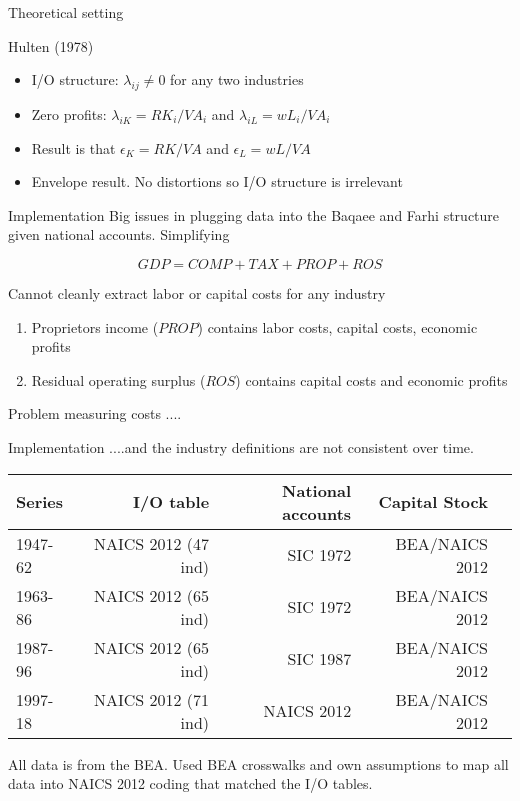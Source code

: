 \documentclass[10pt, xcolor=dvipsnames]{beamer}
\begin{document}
\begin{frame}{Theoretical setting}

Hulten (1978)
\begin{itemize}
  \item I/O structure: $\lambda_{ij} \neq 0$ for any two industries
  \item Zero profits: $\lambda_{iK} = RK_i/VA_i$ and $\lambda_{iL} = wL_i/VA_i$
  \item Result is that $\epsilon_K = RK/VA$ and $\epsilon_L = wL/VA$
  \item Envelope result. No distortions so I/O structure is irrelevant
\end{itemize}

\end{frame}

\begin{frame}{Implementation}
Big issues in plugging data into the Baqaee and Farhi structure given national accounts. Simplifying

\begin{equation}
  GDP = COMP + TAX + PROP + ROS
\end{equation}

Cannot cleanly extract labor or capital costs for any industry
\begin{enumerate}
  \item Proprietors income ($PROP$) contains labor costs, capital costs, economic profits
  \item Residual operating surplus ($ROS$) contains capital costs and economic profits
\end{enumerate}

Problem measuring costs ....

\end{frame}

\begin{frame}{Implementation}
....and the industry definitions are not consistent over time.

\vspace{.25in}

\begin{tabular}{lrrrr}
Series  & I/O table  & National accounts & Capital Stock \\ \hline
1947-62 & NAICS 2012 (47 ind) & SIC 1972 & BEA/NAICS 2012 \\
1963-86 & NAICS 2012 (65 ind) & SIC 1972 & BEA/NAICS 2012 \\
1987-96 & NAICS 2012 (65 ind) & SIC 1987 & BEA/NAICS 2012 \\
1997-18 & NAICS 2012 (71 ind) & NAICS 2012 & BEA/NAICS 2012 \\ \hline
\end{tabular}

\vspace{.25in} All data is from the BEA. Used BEA crosswalks and own assumptions to map all data into NAICS 2012 coding that matched the I/O tables.
\end{frame}
\end{document}
